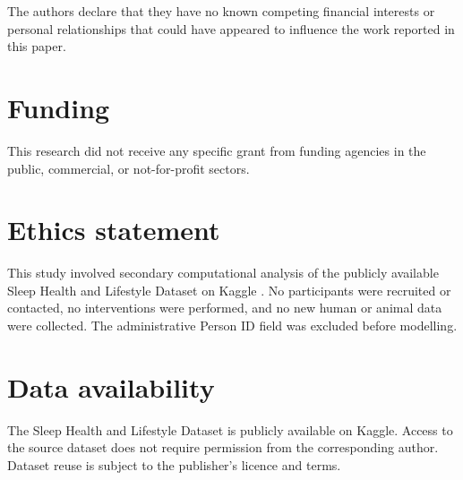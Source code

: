 \documentclass[a4paper,fleqn]{cas-dc}
\begin{document}
The authors declare that they have no known competing financial interests or personal relationships that could have appeared to influence the work reported in this paper.

\section*{Funding}

This research did not receive any specific grant from funding agencies in the public, commercial, or not-for-profit sectors.

\section*{Ethics statement}

This study involved secondary computational analysis of the publicly available Sleep Health and Lifestyle Dataset on Kaggle \cite{kaggle2023}. No participants were recruited or contacted, no interventions were performed, and no new human or animal data were collected. The administrative Person ID field was excluded before modelling.

\section*{Data availability}

The Sleep Health and Lifestyle Dataset is publicly available on Kaggle. Access to the source dataset does not require permission from the corresponding author. Dataset reuse is subject to the publisher's licence and terms.
\end{document}
